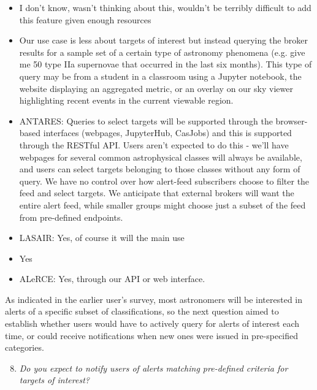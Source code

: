 \documentclass{article}
\begin{document}
\begin{itemize}
\item I don't know, wasn't thinking about this, wouldn't be terribly difficult to add this feature given enough resources
\item Our use case is less about targets of interest but instead querying the broker results for a sample set of a certain type of astronomy phenomena (e.g. give me 50 type IIa supernovae that occurred in the last six months).  This type of query may be from a student in a classroom using a Jupyter notebook, the website displaying an aggregated metric, or an overlay on our sky viewer highlighting recent events in the current viewable region.
\item ANTARES: Queries to select targets will be supported through the browser-based interfaces (webpages, JupyterHub, CasJobs) and this is supported through the RESTful API. Users aren’t expected to do this - we’ll have webpages for several common astrophysical classes will always be available, and users can select targets belonging to those classes without any form of query. We have no control over how alert-feed subscribers choose to filter the feed and select targets. We anticipate that external brokers will want the entire alert feed, while smaller groups might choose just a subset of the feed from pre-defined endpoints. 
\item LASAIR: Yes, of course it will the main use 
\item Yes
\item ALeRCE: Yes, through our API or web interface.
\end{itemize}

As indicated in the earlier user's survey, most astronomers will be interested in alerts of a specific subset of classifications, so the next question aimed to establish whether users would have to actively query for alerts of interest each time, or could receive notifications when new ones were issued in pre-specified categories. 

\begin{enumerate}
\setcounter{enumi}{7}
\item {\em Do you expect to notify users of alerts matching pre-defined criteria for targets of interest?}
\end{enumerate}
\end{document}
